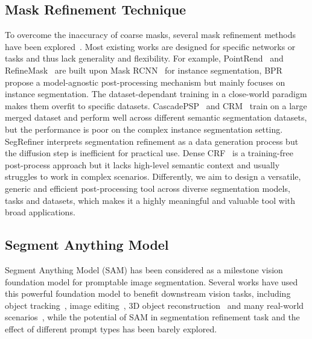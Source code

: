 \subsection{Mask Refinement Technique}
To overcome the inaccuracy of coarse masks, several mask refinement methods have been explored~\cite{zhang2021refinemask,kirillov2020pointrend,xu2017deepmat,zhang2019canet,yuan2020segfix}. Most existing works are designed for specific networks or tasks and thus lack generality and flexibility. For example, PointRend~\cite{kirillov2020pointrend} and RefineMask~\cite{zhang2021refinemask} are built upon Mask RCNN~\cite{he2017maskrcnn} for instance segmentation, BPR~\cite{tang2021look} propose a model-agnostic post-processing mechanism but mainly focuses on instance segmentation. 
The dataset-dependant training in a close-world paradigm makes them overfit to specific datasets.
CascadePSP~\cite{cheng2020cascadepsp} and CRM~\cite{shen2022crm} train on a large merged dataset and perform well across different semantic segmentation datasets, but the performance is poor on the complex instance segmentation setting. %
SegRefiner interprets segmentation refinement as a data generation process but the diffusion step is inefficient for practical use. 
Dense CRF~\cite{CRF} is a training-free post-process approach but it lacks high-level semantic context and usually struggles to work in complex scenarios.
Differently, we aim to design a versatile, generic and efficient post-processing tool across diverse segmentation models, tasks and datasets, which makes it a highly meaningful and valuable tool with broad applications.

 
\subsection{Segment Anything Model}
Segment Anything Model (SAM) has been considered as a milestone vision foundation model for promptable image segmentation. Several works have used this powerful foundation model to benefit downstream vision tasks, including object tracking~\cite{cheng2023segmenttrack, yang2023trackanything}, image editing~\cite{gao2023editanything}, 3D object reconstruction~\cite{shen2023anything3d} and many real-world scenarios~\cite{ma2024medsam, han2023samtransparent, tang2023samcamouflaged}, while the potential of SAM in segmentation refinement task and the effect of different prompt types has been barely explored.












